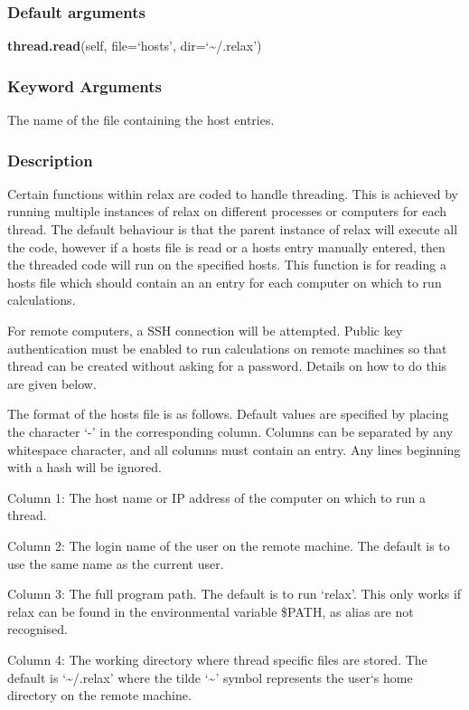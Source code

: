 \subsubsection{Default arguments}

\textsf{\textbf{thread.read}(self, file=`hosts', dir=`\~{}/.relax')}


\subsubsection{Keyword Arguments}

  The name of the file containing the host entries.


\subsubsection{Description}

Certain functions within relax are coded to handle threading.  This is achieved by running
multiple instances of relax on different processes or computers for each thread.  The
default behaviour is that the parent instance of relax will execute all the code, however if
a hosts file is read or a hosts entry manually entered, then the threaded code will run on
the specified hosts.  This function is for reading a hosts file which should contain an
an entry for each computer on which to run calculations.

For remote computers, a SSH connection will be attempted.  Public key authentication must be
enabled to run calculations on remote machines so that thread can be created without asking
for a password.  Details on how to do this are given below.


The format of the hosts file is as follows.  Default values are specified by placing the
character `-' in the corresponding column.  Columns can be separated by any whitespace
character, and all columns must contain an entry.  Any lines beginning with a hash will be
ignored.

Column 1:  The host name or IP address of the computer on which to run a thread.

Column 2:  The login name of the user on the remote machine.  The default is to use the same
name as the current user.

Column 3:  The full program path.  The default is to run `relax'.  This only works if relax
can be found in the environmental variable \$PATH, as alias are not recognised.

Column 4:  The working directory where thread specific files are stored.  The default is
`\~{}/.relax' where the tilde `\~{}' symbol represents the user`s home directory on the remote
machine.

